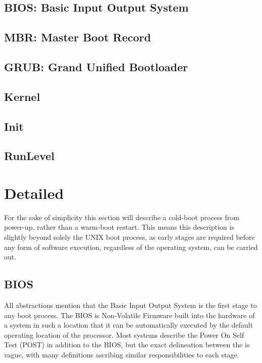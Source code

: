 \documentclass[]{article}
\begin{document}
    \subsection{BIOS: Basic Input Output System}

    \subsection{MBR: Master Boot Record}

    \subsection{GRUB: Grand Unified Bootloader}

    \subsection{Kernel}

    \subsection{Init}

    \subsection{RunLevel}

\newpage
\section{Detailed}

    For the sake of simplicity this section will describe a cold-boot process from power-up, rather than a warm-boot restart. This means this description is slightly beyond solely the UNIX boot process, as early stages are required before any form of software execution, regardless of the operating system, can be carried out.

    \subsection{BIOS}

        All abstractions mention that the Basic Input Output System is the first stage to any boot process. The BIOS is Non-Volatile Firmware built into the hardware of a system in such a location that it can be automatically executed by the default operating location of the processor. Most systems describe the Power On Self Test (POST) in addition to the BIOS, but the exact delineation between the is vague, with many definitions ascribing similar responsibilities to each stage.
\end{document}
